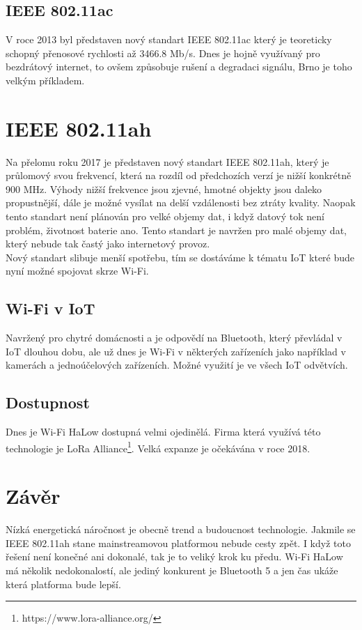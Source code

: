 \documentclass[paper=a4, fontsize=11pt]{scrartcl}
\numberwithin{equation}{section}
\numberwithin{figure}{section}
\numberwithin{table}{section}
\begin{document}
	\subsection{IEEE 802.11ac}
	V roce 2013 byl představen nový standart IEEE 802.11ac
	 který je teoreticky schopný přenosové rychlosti až 3466.8 Mb/s. 
	 Dnes je hojně využívaný pro bezdrátový internet, to ovšem způsobuje rušení a degradaci signálu,
	 Brno je toho velkým příkladem.

\newpage
	 
\section{IEEE 802.11ah}
Na přelomu roku 2017 je představen nový standart IEEE 802.11ah, 
který je průlomový svou frekvencí, 
která na rozdíl od předchozích verzí je nižší konkrétně 900 MHz. 
Výhody nižší frekvence jsou zjevné, 
hmotné objekty jsou daleko propustnější, 
dále je možné vysílat na delší vzdálenosti bez ztráty kvality. 
Naopak tento standart není plánován pro velké objemy dat, 
i když datový tok není problém, 
životnost baterie ano. 
Tento standart je navržen pro malé objemy dat, 
který nebude tak častý jako internetový provoz. \\
Nový standart slibuje menší spotřebu, 
tím se dostáváme k tématu IoT 
které bude nyní možné spojovat skrze Wi-Fi.
	\subsection{Wi-Fi v IoT}
	Navržený pro chytré domácnosti a je odpovědí na Bluetooth, 
	který převládal v IoT dlouhou dobu, 
	ale už dnes je Wi-Fi v některých zařízeních jako například v kamerách 
	a jednoúčelových zařízeních. 
	Možné využití je ve všech IoT odvětvích. 
	\subsection{Dostupnost}
	Dnes je Wi-Fi HaLow dostupná velmi ojedinělá. Firma která využívá této technologie je LoRa Alliance\footnote{https://www.lora-alliance.org/}.
	Velká expanze je očekávána v roce 2018. 

\section{Závěr}
Nízká energetická náročnost je obecně trend a budoucnost technologie. 
Jakmile se IEEE 802.11ah stane mainstreamovou platformou nebude cesty zpět. 
I když toto řešení není konečné ani dokonalé, tak je to veliký krok ku předu. 
Wi-Fi HaLow má několik nedokonalostí, 
ale jediný konkurent je Bluetooth 5 a jen čas ukáže která platforma bude lepší.
\end{document}
